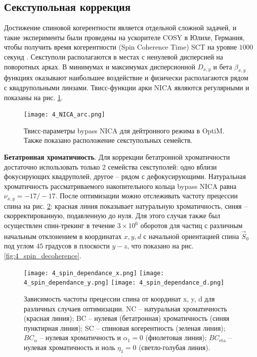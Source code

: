 		\subsection{Секступольная коррекция}\label{sec:EDM/Wien_filter_tracking/sextupole_correction}

\par Достижение спиновой когерентности является отдельной сложной задачей, и такие эксперименты были проведены на ускорителе COSY в Юлихе, Германия, чтобы получить время когерентности (Spin Coherence Time) SCT на уровне $1000$ секунд \cite{1000}. Секступоли располагаются в местах с ненулевой дисперсией на поворотных арках. В минимумах и максимумах дисперсионной $D_{x,y}$ и бета $\beta_{x,y}$ функциях оказывают наибольшее воздействие и физически располагаются рядом с квадрупольными линзами. Твисс-функции арки NICA являются регулярными и показаны на рис. \ref{fig:4_NICA_arc}.

\begin{figure}[!h]
  \centering
   \texttt{[image: 4\_NICA\_arc.png]}
   \caption{Твисс-параметры bypass NICA для дейтронного режима в OptiM. Также показано расположение секступольных семейств.}
   \label{fig:4_NICA_arc}
\end{figure}

\textbf{Бетатронная хроматичность}.
Для коррекции бетатронной хроматичности достаточно использовать только 2 семейства секступолей: одно вблизи фокусирующих квадруполей, другое – рядом с дефокусирующими. Натуральная хроматичность рассматриваемого накопительного кольца bypass NICA равна $\nu_{x,y}=-17/-17$. После оптимизации можно отслеживать частоту прецессии спина на рис. \ref{fig:4_spin_dependance}: красная линия показывает натуральную хроматичность, синяя – скорректированную, подавленную до нуля. Для этого случая также был осуществлен спин-трекинг в течение $3\times{10}^6$ оборотов для частиц с различным начальным отклонением в координатах $x, y, d$ с начальной ориентацией спина ${\vec{S}}_0$ под углом $45$ градусов в плоскости $y-z$, что показано на рис. \ref{fig:4_spin_decoherence}.

\begin{figure}[!h]
	\centering
	\texttt{[image: 4\_spin\_dependance\_x.png]}
	\texttt{[image: 4\_spin\_dependance\_y.png]}
	\texttt{[image: 4\_spin\_dependance\_d.png]}
	\caption{Зависимость частоты прецессии спина от координат x, y, d для различных случаев оптимизации. NC – натуральная хроматичность (красная линия); BC – нулевая (бетатронная) хроматичность (синяя пунктирная линия); SC – спиновая когерентность (зеленая линия); $BC_{\alpha}$ – нулевая хроматичность и $\alpha_1=0$ (фиолетовая линия); $BC_{\text{eta}}$ – нулевая хроматичность и ноль $\eta_1=0$ (светло-голубая линия).}
	\label{fig:4_spin_dependance}
\end{figure}

